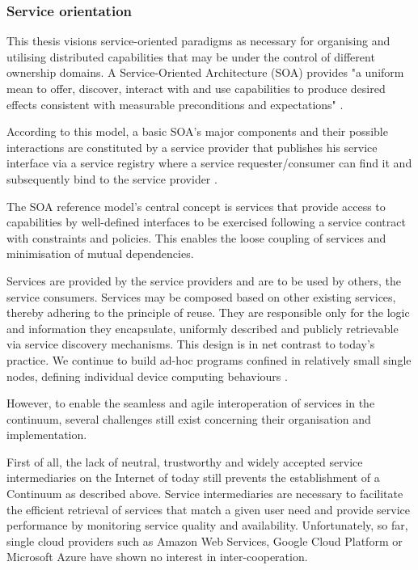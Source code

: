 \documentclass{ieeeaccess}
\begin{document}
\subsubsection{Service orientation}

This thesis visions service-oriented paradigms as necessary for organising and utilising distributed capabilities that may be under the control of different ownership domains. A Service-Oriented Architecture (SOA) provides "a uniform mean to offer, discover, interact with and use capabilities to produce desired effects consistent with measurable preconditions and expectations" \cite{oasis}.

According to this model, a basic SOA's major components and their possible interactions are constituted by a service provider that publishes his service interface via a service registry where a service requester/consumer can find it and subsequently bind to the service provider \cite{iot-enterprise}.

The SOA reference model's central concept is services that provide access to capabilities by well-defined interfaces to be exercised following a service contract with constraints and policies. This enables the loose coupling of services and minimisation of mutual dependencies.

Services are provided by the service providers and are to be used by others, the service consumers. Services may be composed based on other existing services, thereby adhering to the principle of reuse. They are responsible only for the logic and information they encapsulate, uniformly described and publicly retrievable via service discovery mechanisms. This design is in net contrast to today's practice. We continue to build ad-hoc programs confined in relatively small single nodes, defining individual device computing behaviours \cite{harnessing-continuum}.

However, to enable the seamless and agile interoperation of services in the continuum, several challenges still exist concerning their organisation and implementation.

First of all, the lack of neutral, trustworthy and widely accepted service intermediaries on the Internet of today still prevents the establishment of a Continuum as described above. Service intermediaries are necessary to facilitate the efficient retrieval of services that match a given user need and provide service performance by monitoring service quality and availability. Unfortunately, so far, single cloud providers such as Amazon Web Services, Google Cloud Platform or Microsoft Azure have shown no interest in inter-cooperation.
\end{document}
